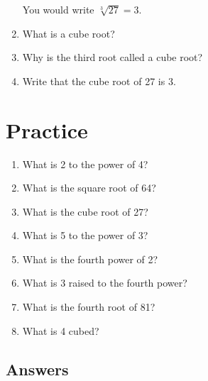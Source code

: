 \documentclass[12pt]{article}
\begin{document}
\begin{enumerate}
\vspace{28pt}
You would write $\sqrt[3]{27} = 3$.

\item What is a cube root?
\item Why is the third root called a cube root?
\item Write that the cube root of 27 is 3.

\end{enumerate}

\section*{Practice}

\begin{enumerate}
\item What is 2 to the power of 4?\\
\item What is the square root of 64?\\
\item What is the cube root of 27?\\
\item What is 5 to the power of 3?\\
\item What is the fourth power of 2?\\
\item What is 3 raised to the fourth power?\\
\item What is the fourth root of 81?\\
\item What is 4 cubed?
\end{enumerate}

\subsection*{Answers}
\end{document}

